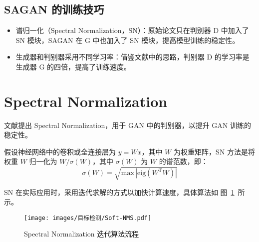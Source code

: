\subsection{SAGAN 的训练技巧}
\begin{itemize}
  \item 谱归一化（Spectral Normalization，SN）：原始论文只在判别器 D 中加入了 SN
    模块，SAGAN 在 G 中也加入了 SN 模块，提高模型训练的稳定性。
  \item 生成器和判别器采用不同学习率：借鉴文献中的思路，判别器
    D 的学习率是生成器 G 的四倍，提高了训练速度。
\end{itemize}

\section{Spectral Normalization}
文献提出 Spectral Normalization，用于 GAN 中的判别器，以提升 GAN
训练的稳定性。

假设神经网络中的卷积或全连接层为 $y = Wx$，其中 $W$ 为权重矩阵，SN 方法是将权重
$W$ 归一化为 $W/\sigma(W)$，其中 $\sigma(W)$ 为 $W$ 的谱范数，即：
\begin{equation}
  \sigma(W) = \sqrt{\mathrm{max} \, \left | \mathrm{eig} (W^{\mathrm{T}} W) \right |}
\end{equation}

SN 在实际应用时，采用迭代求解的方式以加快计算速度，具体算法如
图~\ref{fig:sn-algo}~所示。

\begin{figure}[ht]
  \centering
  \texttt{[image: images/目标检测/Soft-NMS.pdf]}
  \caption{Spectral Normalization 迭代算法流程}
  \label{fig:sn-algo}
\end{figure}


